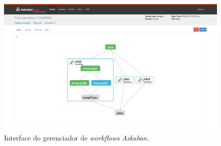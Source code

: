 \begin{figure}[!t]
    \centering
    \includegraphics[width=\linewidth, clip=true, trim=0 180px 0 82px]{Imagens/Azkaban_GUI}
    \caption{Interface do gerenciador de \textit{workflows} \textit{Azkaban}.}
    \label{fig:azkaban}
\end{figure}






